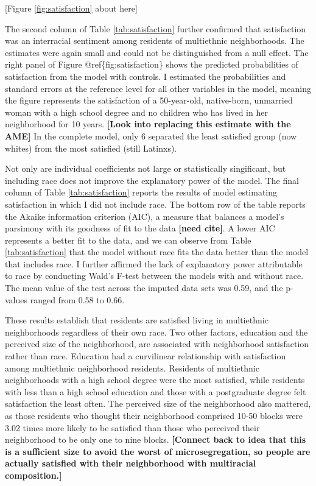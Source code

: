\documentclass[]{article}
\theoremstyle{definition}
\theoremstyle{definition}
\theoremstyle{definition}
\theoremstyle{remark}
\begin{document}
{[}Figure \ref{fig:satisfaction} about here{]}

The second column of Table \ref{tab:satisfaction} further confirmed that
satisfaction was an interracial sentiment among residents of multiethnic
neighborhoods. The estimates were again small and could not be
distinguished from a null effect. The right panel of Figure
@ref\{fig:satisfaction\} shows the predicted probabilities of
satisfaction from the model with controls. I estimated the probabilities
and standard errors at the reference level for all other variables in
the model, meaning the figure represents the satisfaction of a
50-year-old, native-born, unmarried woman with a high school degree and
no children who has lived in her neighborhood for 10 years.
\textbf{{[}Look into replacing this estimate with the AME{]}} In the
complete model, only 6 separated the least satisfied group (now whites)
from the most satisfied (still Latinxs).

Not only are individual coefficients not large or statistically
singificant, but including race does not improve the explanatory power
of the model. The final column of Table \ref{tab:satisfaction} reports
the results of model estimating satisfaction in which I did not include
race. The bottom row of the table reports the Akaike information
criterion (AIC), a measure that balances a model's parsimony with its
goodness of fit to the data \textbf{{[}need cite{]}}. A lower AIC
represents a better fit to the data, and we can observe from Table
\ref{tab:satisfaction} that the model without race fits the data better
than the model that includes race. I further affirmed the lack of
explanatory power attributable to race by conducting Wald's F-test
between the models with and without race. The mean value of the test
across the imputed data sets was 0.59, and the p-values ranged from 0.58
to 0.66.

These results establish that residents are satisfied living in
multiethnic neighborhoods regardless of their own race. Two other
factors, education and the perceived size of the neighborhood, are
associated with neighborhood satisfaction rather than race. Education
had a curvilinear relationship with satisfaction among multiethnic
neighborhood residents. Residents of multiethnic neighborhoods with a
high school degree were the most satisfied, while residents with less
than a high school education and those with a postgraduate degree felt
satisfaction the least often. The perceived size of the neighborhood
also mattered, as those residents who thought their neighborhood
comprised 10-50 blocks were 3.02 times more likely to be satisfied than
those who perceived their neighborhood to be only one to nine blocks.
\textbf{{[}Connect back to idea that this is a sufficient size to avoid
the worst of microsegregation, so people are actually satisfied with
their neighborhood with multiracial composition.{]}}
\end{document}
